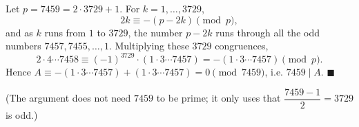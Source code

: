 Let $p=7459=2\cdot3729+1$. For $k=1,\dots,3729$,
\[2k\equiv-(p-2k)\pmod p,\]
and as $k$ runs from $1$ to $3729$, the number $p-2k$ runs through all the odd numbers $7457,7455,\dots,1$. Multiplying these $3729$ congruences,
\[2\cdot4\cdots7458\equiv(-1)^{3729}\cdot(1\cdot3\cdots7457)=-(1\cdot3\cdots7457)\pmod p.\]
Hence $A\equiv-(1\cdot3\cdots7457)+(1\cdot3\cdots7457)=0\pmod{7459}$, i.e. $7459\mid A$. $\blacksquare$

(The argument does not need $7459$ to be prime; it only uses that $\dfrac{7459-1}{2}=3729$ is odd.)
